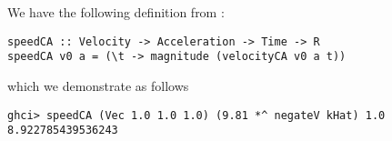 
We have the following definition from :
\scriptsize\begin{verbatim}
speedCA :: Velocity -> Acceleration -> Time -> R
speedCA v0 a = (\t -> magnitude (velocityCA v0 a t))
\end{verbatim}\normalsize
which we demonstrate as follows
\scriptsize\begin{verbatim}
ghci> speedCA (Vec 1.0 1.0 1.0) (9.81 *^ negateV kHat) 1.0
8.922785439536243
\end{verbatim}\normalsize
